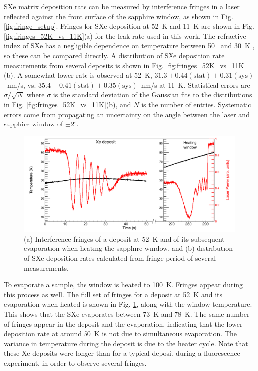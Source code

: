 SXe matrix deposition rate can be measured by interference fringes in a laser reflected against the front surface of the sapphire window, as shown in Fig. \ref{fig:fringe_setup}.  Fringes for SXe deposition at 52~K and 11~K are shown in Fig. \ref{fig:fringes_52K_vs_11K}(a) for the leak rate used in this work.  The refractive index of SXe has a negligible dependence on temperature between 50~ and 30~K \cite{SXeIndex}, so these can be compared directly.  A distribution of SXe deposition rate measurements from several deposits is shown in Fig. \ref{fig:fringes_52K_vs_11K}(b).  A somewhat lower rate is observed at 52~K, $31.3 \pm 0.44(\text{stat}) \pm 0.31(\text{sys})$~nm/s, vs. $35.4 \pm 0.41(\text{stat}) \pm 0.35(\text{sys})$~nm/s at 11~K.  Statistical errors are $\sigma / \sqrt{N}$ where $\sigma$ is the standard deviation of the Gaussian fits to the distributions in Fig. \ref{fig:fringes_52K_vs_11K}(b), and $N$ is the number of entries.  Systematic errors come from propagating an uncertainty on the angle between the laser and sapphire window of $\pm 2^{\circ}$.

\begin{figure} %
        \centering
                \includegraphics[width=.9\textwidth]{figures/fringes_dep_and_melt.png}
                \caption{(a) Interference fringes of a deposit at 52~K and of its subsequent evaporation when heating the sapphire window, and (b) distribution of SXe deposition rates calculated from fringe period of several measurements.}
\label{fig:fringes_melt_withDep}
\end{figure}

To evaporate a sample, the window is heated to 100~K.  Fringes appear during this process as well.  The full set of fringes for a deposit at 52~K and its evaporation when heated is shown in Fig. \ref{fig:fringes_melt_withDep}, along with the window temperature.  This shows that the SXe evaporates between 73~K and 78~K.  The same number of fringes appear in the deposit and the evaporation, indicating that the lower deposition rate at around 50~K is not due to simultaneous evaporation.  The variance in temperature during the deposit is due to the heater cycle.  Note that these Xe deposits were longer than for a typical deposit during a fluorescence experiment, in order to observe several fringes.

